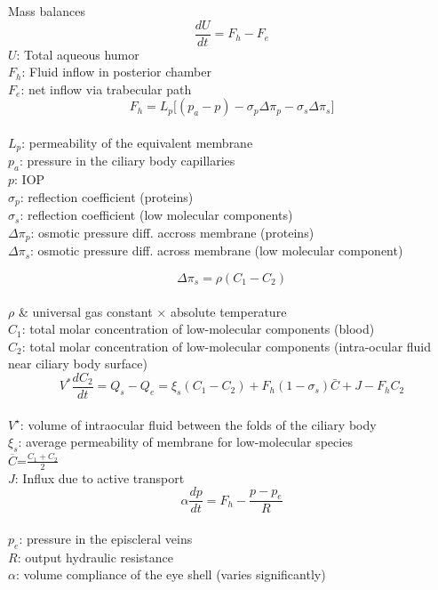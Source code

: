 \documentclass[9pt]{beamer}
\begin{document}
\begin{frame}{Mass balances}
$$ \frac{dU}{dt}=F_{h}-F_{e}$$
$U$: Total aqueous humor\\
$F_h$: Fluid inflow in posterior chamber\\
$F_e$: net inflow via trabecular path
\newline
\\

$$F_{h}= L_p \big[ (p_a-p)-\sigma_{p} \Delta\pi_{p}-\sigma_{s} \Delta\pi_{s}\big]$$\\
$L_p$: permeability of the equivalent membrane\\
$p_a$: pressure in the ciliary body capillaries\\
$p$: IOP \\
$\sigma_p$: reflection coefficient (proteins)\\
$\sigma_s$: reflection coefficient (low molecular components)\\
$\Delta \pi_p $: osmotic pressure diff. accross membrane (proteins)\\
$\Delta \pi_s $: osmotic pressure diff. across membrane (low molecular component)
\newline
\\
\end{frame}
\begin{frame}
$$\Delta\pi_{s}= \rho(C_1-C_{2}) $$\\
$\rho$ & universal gas constant $\times$  absolute temperature\\
$C_1$: total molar concentration of low-molecular components (blood)\\
$C_2$: total molar concentration of low-molecular components (intra-ocular fluid near ciliary body surface) 
\newline
\\
$$ V^{\ast} \frac{dC_{2}}{dt}= Q_s-Q_e=\xi_s(C_1-C_{2})+F_h (1-\sigma_s) \bar{C}+J-F_h C_2$$\\
$V^\star$: volume of intraocular fluid between the folds of the ciliary body\\
$\xi_s$: average permeability of membrane for low-molecular species\\
$\overline{C}$=$\displaystyle{\frac{C_1+C_2}{2}}$\\
$J$: Influx due to active transport
\newline
\\
$$ \alpha \frac{dp}{dt}=F_{h}-\frac{p-p_e}{R}$$\\
$p_e$: pressure in the episcleral veins\\
$R$: output hydraulic resistance\\
$\alpha$: volume compliance of the eye shell (varies significantly)
\newline
\\
\end{frame}
\end{document}
